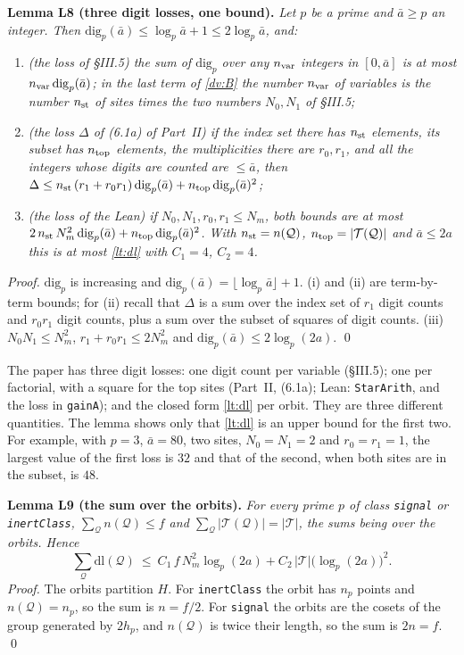 \documentclass[11pt,letterpaper]{article}
\begin{document}
\textbf{Lemma L8 (three digit losses, one bound).} \emph{Let $p$ be a prime and $\bar a\ge p$ an integer.
Then $\mathrm{dig}_p(\bar a)\le\log_p\bar a+1\le2\log_p\bar a$, and:}
\begin{enumerate}[label=\textup{(\roman*)},leftmargin=2.4em,itemsep=1pt,topsep=2pt]
\item \emph{(the loss of \S III.5) the sum of $\mathrm{dig}_p$ over any $n_{\rm var}$ integers in
$[0,\bar a]$ is at most $n_{\rm var}\,\mathrm{dig}_p(\bar a)$; in the last term of \eqref{dv:B} the number
$n_{\rm var}$ of variables is the number $n_{\rm st}$ of sites times the two numbers $N_0,N_1$ of
\S III.5;}
\item \emph{(the loss $\Delta$ of \textup{(6.1a)} of Part~II) if the index set there has $n_{\rm st}$
elements, its subset has $n_{\rm top}$ elements, the multiplicities there are $r_0,r_1$, and all the
integers whose digits are counted are $\le\bar a$, then
$\Delta\le n_{\rm st}\,(r_1+r_0r_1)\,\mathrm{dig}_p(\bar a)+n_{\rm top}\,\mathrm{dig}_p(\bar a)^2$;}
\item \emph{(the loss of the Lean) if $N_0,N_1,r_0,r_1\le N_m$, both bounds are at most
$2\,n_{\rm st}\,N_m^2\,\mathrm{dig}_p(\bar a)+n_{\rm top}\,\mathrm{dig}_p(\bar a)^2$. With
$n_{\rm st}=n(\mathcal Q)$, $n_{\rm top}=|\mathcal T(\mathcal Q)|$ and $\bar a\le2a$ this is at most
\eqref{lt:dl} with $C_1=4$, $C_2=4$.}
\end{enumerate}
\emph{Proof.} $\mathrm{dig}_p$ is increasing and $\mathrm{dig}_p(\bar a)=\lfloor\log_p\bar a\rfloor+1$.
(i) and (ii) are term-by-term bounds; for (ii) recall that $\Delta$ is a sum over the index set of $r_1$
digit counts and $r_0r_1$ digit counts, plus a sum over the subset of squares of digit counts.
(iii) $N_0N_1\le N_m^2$, $r_1+r_0r_1\le2N_m^2$ and $\mathrm{dig}_p(\bar a)\le2\log_p(2a)$. \qed

\noindent The paper has three digit losses: one digit count per variable (\S III.5); one per factorial,
with a square for the top sites (Part~II, (6.1a); Lean: \texttt{StarArith}, and the loss in
\texttt{gainA}); and the closed form \eqref{lt:dl} per orbit. They are three different quantities. The
lemma shows only that \eqref{lt:dl} is an upper bound for the first two. For example, with $p=3$,
$\bar a=80$, two sites, $N_0=N_1=2$ and $r_0=r_1=1$, the largest value of the first loss is $32$ and that
of the second, when both sites are in the subset, is $48$.

\textbf{Lemma L9 (the sum over the orbits).} \emph{For every prime $p$ of class \texttt{signal} or
\texttt{inertClass}, $\sum_{\mathcal Q}n(\mathcal Q)\le f$ and
$\sum_{\mathcal Q}|\mathcal T(\mathcal Q)|=|\mathcal T|$, the sums being over the orbits. Hence}
\begin{equation}\label{lt:dlsum}
 \sum_{\mathcal Q}\mathrm{dl}(\mathcal Q)\ \le\ C_1\,f\,N_m^2\log_p(2a)+C_2\,|\mathcal T|\big(\log_p(2a)\big)^2 .
\end{equation}
\emph{Proof.} The orbits partition $H$. For \texttt{inertClass} the orbit has $n_p$ points and
$n(\mathcal Q)=n_p$, so the sum is $n=f/2$. For \texttt{signal} the orbits are the cosets of the group
generated by $2h_p$, and $n(\mathcal Q)$ is twice their length, so the sum is $2n=f$. \qed
\end{document}
